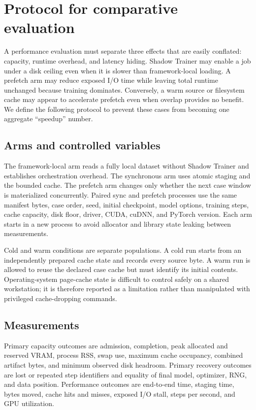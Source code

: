 \section{Protocol for comparative evaluation}

A performance evaluation must separate three effects that are easily conflated:
capacity, runtime overhead, and latency hiding. Shadow Trainer may enable a job
under a disk ceiling even when it is slower than framework-local loading. A
prefetch arm may reduce exposed I/O time while leaving total runtime unchanged
because training dominates. Conversely, a warm source or filesystem cache may
appear to accelerate prefetch even when overlap provides no benefit. We define
the following protocol to prevent these cases from becoming one aggregate
``speedup'' number.

\subsection{Arms and controlled variables}

The framework-local arm reads a fully local dataset without Shadow Trainer and
establishes orchestration overhead. The synchronous arm uses atomic staging and
the bounded cache. The prefetch arm changes only whether the next case window is
materialized concurrently. Paired sync and prefetch processes use the same
manifest bytes, case order, seed, initial checkpoint, model options, training
steps, cache capacity, disk floor, driver, CUDA, cuDNN, and PyTorch version.
Each arm starts in a new process to avoid allocator and library state leaking
between measurements.

Cold and warm conditions are separate populations. A cold run starts from an
independently prepared cache state and records every source byte. A warm run is
allowed to reuse the declared case cache but must identify its initial contents.
Operating-system page-cache state is difficult to control safely on a shared
workstation; it is therefore reported as a limitation rather than manipulated
with privileged cache-dropping commands.

\subsection{Measurements}

Primary capacity outcomes are admission, completion, peak allocated and reserved
VRAM, process RSS, swap use, maximum cache occupancy, combined artifact bytes,
and minimum observed disk headroom. Primary recovery outcomes are lost or
repeated step identifiers and equality of final model, optimizer, RNG, and data
position. Performance outcomes are end-to-end time, staging time, bytes moved,
cache hits and misses, exposed I/O stall, steps per second, and GPU utilization.

